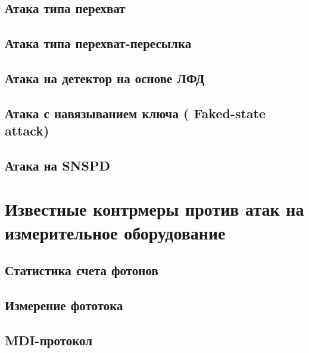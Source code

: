 \subsection{Атака типа перехват} \label{subsec:ch1/sec6/sub2}


\subsection{Атака типа перехват-пересылка} \label{subsec:ch1/sec6/sub3}


\subsection{Атака на детектор на основе ЛФД} \label{subsec:ch1/sec6/sub4}



\subsection{Атака с навязыванием ключа ( Faked-state attack)} \label{subsec:ch1/sec6/sub5}


\subsection{Атака на SNSPD} \label{subsec:ch1/sec6/sub6}



\section{Известные контрмеры против атак на измерительное оборудование} \label{sec:ch1/sec7}


\subsection{Статистика счета фотонов} \label{subsec:ch1/sec7/sub1}

\subsection{Измерение фототока} \label{subsec:ch1/sec7/sub2}

\subsection{MDI-протокол} \label{subsec:ch1/sec7/sub3}


